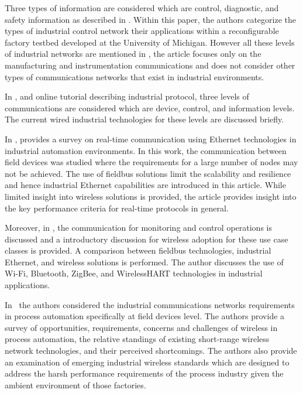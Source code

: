 Three types of information are considered which are control, diagnostic, and safety information as described in \cite{Moyne2007}.  Within this paper, the authors categorize the types of industrial control network their applications within a reconfigurable factory testbed developed at the University of Michigan. However all these levels of industrial networks are mentioned in \cite{Galloway2013}, the article focuses only on the manufacturing and instrumentation communications and does not consider other types of communications networks that exist in industrial environments. 

In \cite{What2017}, and online tutorial describing industrial protocol, three levels of communications are considered which are device, control, and information levels. The current wired industrial technologies for these levels are discussed briefly. 

In \cite{Danielis2014}, provides a survey on real-time communication using Ethernet technologies in industrial automation environments.  In this work, the communication between field devices was studied where the requirements for a large number of nodes may not be achieved. The use of fieldbus solutions limit the scalability and resilience and hence industrial Ethernet capabilities are introduced in this article. While limited insight into wireless solutions is provided, the article provides insight into the key performance criteria for real-time protocols in general.

Moreover, in \cite{Connectivity}, the communication for monitoring and control operations is discussed and a introductory discussion for wireless adoption for these use case classes is provided. A comparison between fieldbus technologies, industrial Ethernet, and wireless solutions is performed. The author discusses the use of Wi-Fi, Bluetooth, ZigBee, and WirelessHART technologies in industrial applications. 

In~\cite{Ikram2010} the authors considered the industrial communications networks requirements in process automation specifically at field devices level. The authors provide a survey of opportunities, requirements, concerns and challenges of wireless in process automation, the relative standings of existing short-range wireless network technologies, and their perceived shortcomings. The authors also provide an examination of emerging industrial wireless standards which are designed to address the harsh performance requirements of the process industry given the ambient environment of those factories.


